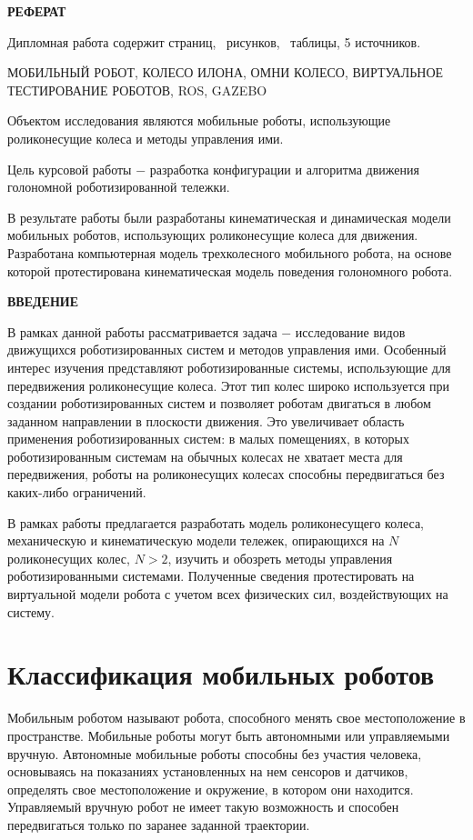 \documentclass[oneside,final,14pt]{extreport}
\providecommand\totfig{}
\providecommand\tottab{}
\begin{document}
\begin{center}
\bfseries РЕФЕРАТ
\end{center}

Дипломная работа содержит \pageref{LastPage} страниц, \totfig\ рисунков, \tottab\ таблицы, 5 источников.

МОБИЛЬНЫЙ РОБОТ, КОЛЕСО ИЛОНА, ОМНИ КОЛЕСО, ВИРТУАЛЬНОЕ ТЕСТИРОВАНИЕ РОБОТОВ, ROS, GAZEBO

Объектом исследования являются мобильные роботы, использующие роликонесущие колеса и методы управления ими.

Цель курсовой работы $-$ разработка конфигурации и алгоритма движения голономной роботизированной тележки.

В результате работы были разработаны кинематическая и динамическая модели мобильных роботов, использующих роликонесущие колеса для движения. Разработана компьютерная модель трехколесного мобильного робота, на основе которой протестирована кинематическая модель поведения голономного робота.

\tableofcontents
\newpage
\begin{center}
\bfseries ВВЕДЕНИЕ
\end{center}

В рамках данной работы рассматривается задача $-$ исследование видов движущихся роботизированных систем и методов управления ими. Особенный интерес изучения представляют роботизированные системы, использующие для передвижения роликонесущие колеса. Этот тип колес широко используется при создании роботизированных систем и позволяет роботам двигаться в любом заданном направлении в плоскости движения. Это увеличивает область применения роботизированных систем: в малых помещениях, в которых роботизированным системам на обычных колесах не хватает места для передвижения, роботы на роликонесущих колесах способны передвигаться без каких-либо ограничений. 

В рамках работы предлагается разработать модель роликонесущего колеса, механическую и кинематическую модели тележек, опирающихся на $N$ роликонесущих колес, $N>2$, изучить и обозреть методы управления роботизированными системами. Полученные сведения протестировать на виртуальной модели робота с учетом всех физических сил, воздействующих на систему.

\chapter{Классификация мобильных роботов}
Мобильным роботом называют робота, способного менять свое местоположение в пространстве. Мобильные роботы могут быть автономными или управляемыми вручную. Автономные мобильные роботы способны без участия человека, основываясь на показаниях установленных на нем сенсоров и датчиков, определять свое местоположение и окружение, в котором они находится. Управляемый вручную робот не имеет такую возможность и способен передвигаться только по заранее заданной траектории.
\end{document}
